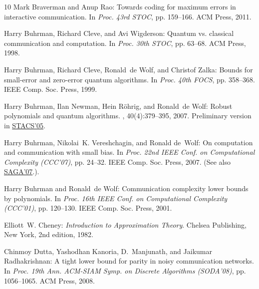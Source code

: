 \begin{thebibliography}{10}
{\sc Mark Braverman and Anup Rao}: Towards coding for maximum errors in
  interactive communication.
\newblock In {\em Proc. 43rd STOC}, pp. 159--166. ACM Press, 2011.
\newblock [\epfmtdoi{10.1145/1993636.1993659}]

{\sc Harry Buhrman, Richard Cleve, and Avi Wigderson}: Quantum vs. classical
  communication and computation.
\newblock In {\em Proc. 30th STOC}, pp. 63--68. ACM Press, 1998.
\newblock [\epfmtdoi{10.1145/276698.276713}]

{\sc Harry Buhrman, Richard Cleve, Ronald~de Wolf, and Christof Zalka}: Bounds
  for small-error and zero-error quantum algorithms.
\newblock In {\em Proc. 40th FOCS}, pp. 358--368. IEEE Comp. Soc. Press, 1999.

{\sc Harry Buhrman, Ilan Newman, Hein R{\"o}hrig, and Ronald~de Wolf}: Robust
  polynomials and quantum algorithms.
, 40(4):379--395, 2007.
\newblock Preliminary version in
  \href{http://dx.doi.org/10.1007/978-3-540-31856-9_49}{STACS'05}.
\newblock [\epfmtdoi{10.1007/s00224-006-1313-z}]

{\sc Harry Buhrman, Nikolai~K. Vereshchagin, and Ronald de~Wolf}: On
  computation and communication with small bias.
\newblock In {\em Proc. 22nd IEEE Conf. on Computational Complexity (CCC'07)},
  pp. 24--32. IEEE Comp. Soc. Press, 2007.
\newblock (See also
  \href{http://dx.doi.org/10.1007/978-3-540-74871-7_1}{SAGA'07}.).

{\sc Harry Buhrman and Ronald~de Wolf}: Communication complexity lower bounds
  by polynomials.
\newblock In {\em Proc. 16th IEEE Conf. on Computational Complexity (CCC'01)},
  pp. 120--130. IEEE Comp. Soc. Press, 2001.

{\sc Elliott~W. Cheney}: {\em Introduction to Approximation Theory}.
\newblock Chelsea Publishing, New York, 2nd edition, 1982.

{\sc Chinmoy Dutta, Yashodhan Kanoria, D.~Manjunath, and Jaikumar
  Radhakrishnan}: A tight lower bound for parity in noisy communication
  networks.
\newblock In {\em Proc. 19th Ann. ACM-SIAM Symp. on Discrete Algorithms
  (SODA'08)}, pp. 1056--1065. ACM Press, 2008.


\end{thebibliography}
